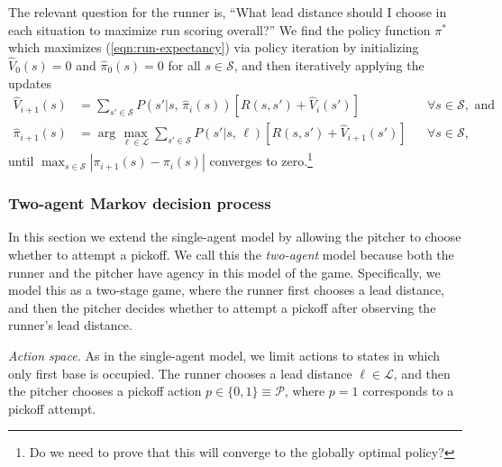 \documentclass{article}
\begin{document}
        The relevant question for the runner is, ``What lead distance should I choose in each situation to maximize run scoring overall?'' We find the policy function $\pi^*$ which maximizes (\ref{eqn:run-expectancy}) via policy iteration \parencite{bellman_dynamic_1957} by initializing $\hat V_0(s) = 0$ and $\hat \pi_0(s) = 0$ for all $s \in \mathcal{S}$, and then iteratively applying the updates
        \begin{align}
          \label{eqn:update-value-single-agent}
          \hat V_{i+1}(s) &= \sum_{s' \in \mathcal{S}} P(s' | s,\, \hat\pi_i(s)) [R(s, s') + \hat V_i(s')] && \forall s \in \mathcal{S}, \mbox{ and}\\
          \label{eqn:update-policy-single-agent}
          \hat\pi_{i+1}(s) &= \arg\max_{\ell \in \mathcal{L}} \sum_{s' \in \mathcal{S}} P(s' | s,\, \ell) [R(s, s') + \hat V_{i+1}(s')] && \forall s \in \mathcal{S},
        \end{align}
        until $\max_{s\in\mathcal{S}}|\pi_{i+1}(s) - \pi_i(s)|$ converges to zero.\footnote{Do we need to prove that this will converge to the globally optimal policy?}
    
      \subsubsection{Two-agent Markov decision process}
      \label{sec:two-agent-mdp}

        In this section we extend the single-agent model by allowing the pitcher to choose whether to attempt a pickoff. We call this the {\it two-agent} model because both the runner and the pitcher have agency in this model of the game. Specifically, we model this as a two-stage game, where the runner first chooses a lead distance, and then the pitcher decides whether to attempt a pickoff after observing the runner's lead distance.

        {\it Action space.} As in the single-agent model, we limit actions to states in which only first base is occupied. The runner chooses a lead distance $\ell \in \mathcal{L}$, and then the pitcher chooses a pickoff action $p \in \{0, 1\} \equiv \mathcal{P}$, where $p = 1$ corresponds to a pickoff attempt.
\end{document}
